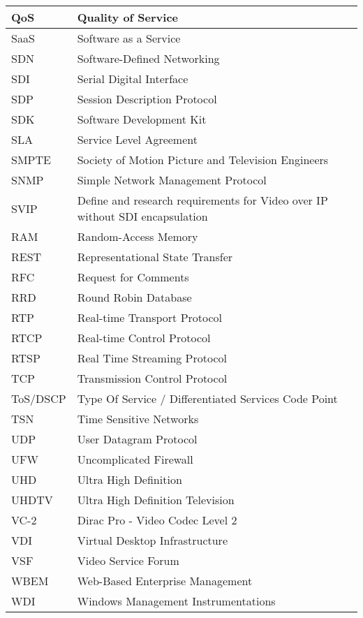 \begin{longtable}{p{} p{}}
\hline
QoS & Quality of Service \\
\hline
SaaS & Software as a Service \\
\hline
SDN & Software-Defined Networking \\
\hline
SDI & Serial Digital Interface \\
\hline
SDP & Session Description Protocol \\
\hline
SDK & Software Development Kit \\
\hline
SLA & Service Level Agreement \\
\hline
SMPTE & Society of Motion Picture and Television Engineers \\
\hline
SNMP & Simple Network Management Protocol \\
\hline
SVIP & Define and research requirements for Video over IP without SDI encapsulation \\
\hline
RAM & Random-Access Memory \\
\hline
REST & Representational State Transfer \\
\hline
RFC & Request for Comments \\
\hline
RRD & Round Robin Database \\
\hline
RTP & Real-time Transport Protocol \\
\hline
RTCP & Real-time Control Protocol  \\
\hline
RTSP & Real Time Streaming Protocol  \\
\hline
TCP & Transmission Control Protocol \\
\hline
ToS/DSCP & Type Of Service / Differentiated Services Code Point \\
\hline
TSN & Time Sensitive Networks \\
\hline
UDP & User Datagram Protocol \\
\hline
UFW & Uncomplicated Firewall \\
\hline
UHD & Ultra High Definition \\
\hline
UHDTV & Ultra High Definition Television \\
\hline
VC-2 & Dirac Pro - Video Codec Level 2 \\
\hline
VDI & Virtual Desktop Infrastructure \\
\hline
VSF & Video Service Forum \\ 
\hline
WBEM & Web-Based Enterprise Management \\ 
\hline
WDI & Windows Management Instrumentations \\ 
\hline
\end{longtable}


